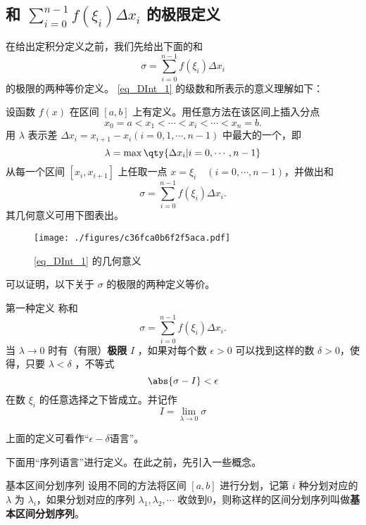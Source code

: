 
\subsection{和 $\sum_{i=0}^{n-1}f(\xi_i)\Delta x_i$ 的极限定义}
在给出定积分定义之前，我们先给出下面的和
\begin{equation}\label{eq_DInt_1}
\sigma=\sum_{i=0}^{n-1}f(\xi_i)\Delta x_i
\end{equation}
的极限的两种等价定义。
\autoref{eq_DInt_1} 的级数和所表示的意义理解如下：

设函数 $f(x)$ 在区间 $[a,b]$ 上有定义。用任意方法在该区间上插入分点
\begin{equation}
x_0=a<x_1<\cdots<x_i<\cdots<x_n=b.
\end{equation}
用 $\lambda$ 表示差 $\Delta x_i=x_{i+1}-x_i(i=0,1,\cdots,n-1)$ 中最大的一个，即
\begin{equation}
\lambda=\max\qty{\Delta x_i|i=0,\cdots,n-1}
\end{equation}
从每一个区间 $[x_i,x_{i+1}]$ 上任取一点 $x=\xi_i\quad (i=0,\cdots,n-1)$，并做出和
\begin{equation}
\sigma=\sum_{i=0}^{n-1}f(\xi_i)\Delta x_i.
\end{equation}
其几何意义可用下图表出。
\begin{figure}[ht]
\centering
\texttt{[image: ./figures/c36fca0b6f2f5aca.pdf]}
\caption{\autoref{eq_DInt_1} 的几何意义} \label{fig_DInt1}
\end{figure}
可以证明，以下关于 $\sigma$ 的极限的两种定义等价。
\begin{definition}{第一种定义}
称和
\begin{equation}
\sigma=\sum_{i=0}^{n-1}f(\xi_i)\Delta x_i.
\end{equation}
当 $\lambda\rightarrow0$ 时有（有限）\textbf{极限} $I$ ，如果对每个数 $\epsilon>0$ 可以找到这样的数 $\delta>0$，使得，只要 $\lambda<\delta$ ，不等式
\begin{equation}
\abs{\sigma-I}<\epsilon
\end{equation}
在数 $\xi_i$ 的任意选择之下皆成立。并记作
\begin{equation}
I=\lim_{\lambda\rightarrow0}\sigma
\end{equation}
\end{definition}
上面的定义可看作“$\epsilon-\delta$语言”。 

下面用“序列语言”进行定义。在此之前，先引入一些概念。
\begin{definition}{基本区间分划序列}
设用不同的方法将区间 $[a,b]$ 进行分划，记第 $i$ 种分划对应的 $\lambda$ 为 $\lambda_i$，如果分划对应的序列 $\lambda_1,\lambda_2,\cdots$ 收敛到0，则称这样的区间分划序列叫做\textbf{基本区间分划序列}。
\end{definition}

